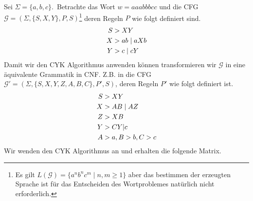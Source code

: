 \begin{Bsp}
	Sei $\Sigma=\{a,b,c\}$.\
	Betrachte das Wort $w=aaabbbcc$ und die \ac{CFG} $\mathcal{G} = (\Sigma, \{S,X,Y\}, P, S)$\footnote{
		Es gilt $L(\mathcal{G})=\{a^nb^nc^m \mid n,m\geq 1\}$ 
		aber das bestimmen der erzeugten Sprache ist für das Entscheiden des Wortproblemes 
		natürlich nicht erforderlich.}
	deren Regeln $P$ wie folgt definiert sind.
	\begin{align*}
		S &\-> XY\\
		X &\-> ab \mid aXb\\
		Y &\-> c \mid cY
	\end{align*}
	Damit wir den \ac{CYK} Algorithmus anwenden können transformieren wir $\mathcal{G}$ in eine äquivalente Grammatik in CNF.
	Z.B. in die \ac{CFG} $\mathcal{G'} = (\Sigma, \{S, X, Y, Z, A, B, C\}, P', S)$, deren Regeln $P'$ wie folgt definiert ist.
	\begin{align*}
		S &\-> XY\\
		X &\-> AB \mid AZ\\
		Z &\-> XB\\
		Y &\-> CY | c\\
		A &\-> a, B \-> b, C \-> c
	\end{align*}
	Wir wenden den CYK Algorithmus an und erhalten die folgende Matrix.
	


\end{Bsp}
